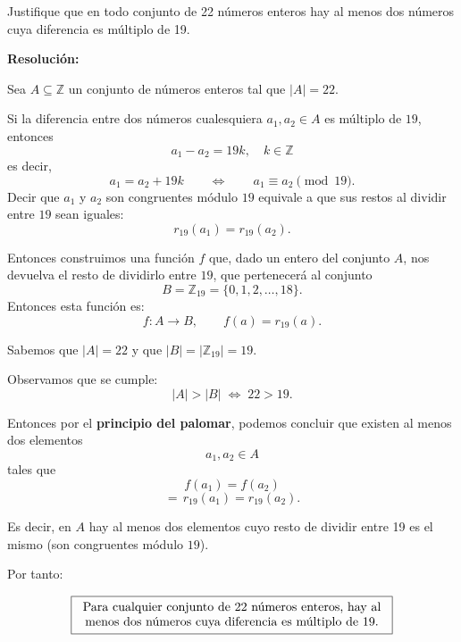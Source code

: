 \documentclass[a4paper,12pt]{article}
\begin{document}
\begin{ejercicio}[title=Ejercicio 38]
Justifique que en todo conjunto de 22 números enteros hay al menos dos números cuya diferencia es múltiplo de 19.

\tcblower
\textbf{Resolución:}

Sea \(A\subseteq\mathbb{Z}\) un conjunto de números enteros tal que \(|A|=22\).

Si la diferencia entre dos números cualesquiera \(a_1,a_2\in A\) es múltiplo de \(19\), entonces
\[
a_1-a_2 = 19k, \quad k\in\mathbb{Z} 
\]
es decir,
\[
a_1 = a_2 + 19k \qquad \Longleftrightarrow \qquad a_1 \equiv a_2 \pmod{19}.
\]
Decir que \(a_1\) y \(a_2\) son congruentes módulo \(19\) equivale a que sus restos al dividir entre \(19\) sean iguales:
\[
r_{19}(a_1)=r_{19}(a_2).
\]

Entonces construimos una función $f$ que, dado un entero del conjunto \(A\), nos devuelva el resto de dividirlo entre \(19\), que pertenecerá al conjunto
\[
B = \mathbb{Z}_{19} = \{0,1,2,\dots,18\}.
\]
Entonces esta función es:
\[
f : A \to B,\qquad f(a) = r_{19}(a).
\]

Sabemos que \(|A| = 22\) y que \(|B| = |\mathbb{Z}_{19}| = 19\).

\vspace{0.5em}

Observamos que se cumple:
\[
|A| > |B| \;\Longleftrightarrow\; 22 > 19.
\]

Entonces por el \textbf{principio del palomar}, podemos concluir que existen al menos dos elementos
\[
a_1,a_2 \in A
\]
tales que
\[
f(a_1) = f(a_2)
\]
\[
=\, r_{19}(a_1) = r_{19}(a_2).
\]

Es decir, en \(A\) hay al menos dos elementos cuyo resto de dividir entre 19 es el mismo (son congruentes módulo \(19\)).

\vspace{0.5em}

Por tanto:

$$\text{\fbox{\begin{tabular}{c} Para cualquier conjunto de 22 números enteros, hay al \\ menos dos números cuya diferencia es múltiplo de 19. \end{tabular}}}$$

\end{ejercicio}
\end{document}
